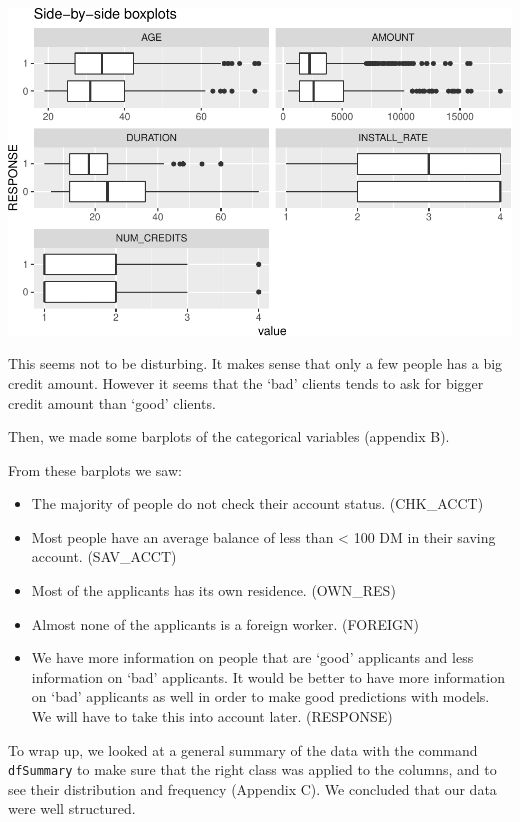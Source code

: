 \documentclass[
]{article}
\providecommand{\tightlist}{%
  \setlength{\itemsep}{0pt}\setlength{\parskip}{0pt}}
\begin{document}
\begin{center}\includegraphics{report_files/figure-latex/unnamed-chunk-10-1} \end{center}

This seems not to be disturbing. It makes sense that only a few people
has a big credit amount. However it seems that the `bad' clients tends
to ask for bigger credit amount than `good' clients.

Then, we made some barplots of the categorical variables (appendix B).

From these barplots we saw:

\begin{itemize}
\tightlist
\item
  The majority of people do not check their account status. (CHK\_ACCT)
\item
  Most people have an average balance of less than \textless{} 100 DM in
  their saving account. (SAV\_ACCT)
\item
  Most of the applicants has its own residence. (OWN\_RES)
\item
  Almost none of the applicants is a foreign worker. (FOREIGN)
\item
  We have more information on people that are `good' applicants and less
  information on `bad' applicants. It would be better to have more
  information on `bad' applicants as well in order to make good
  predictions with models. We will have to take this into account later.
  (RESPONSE)
\end{itemize}

To wrap up, we looked at a general summary of the data with the command
\texttt{dfSummary} to make sure that the right class was applied to the
columns, and to see their distribution and frequency (Appendix C). We
concluded that our data were well structured.
\end{document}
